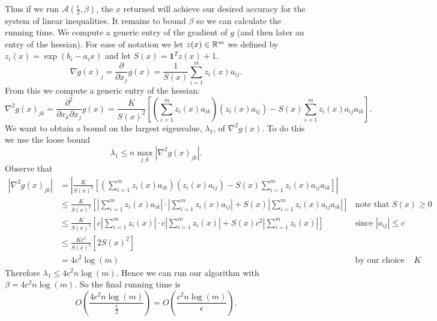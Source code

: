 \documentclass[letterpaper,12pt,oneside,onecolumn]{article}
\newcommand{\cA}{\mathcal{A}} \newcommand{\cB}{\mathcal{B}}
\begin{document}
\paragraph{}
Thus if we run $\cA(\frac{\epsilon}{2}, \beta)$, the $x$ returned will achieve our desired accuracy for the system of linear inequalities. It remains to bound $\beta$ so we can calculate the running time. We compute a generic entry of the gradient of $g$ (and then later an entry of the hessian). For ease of notation we let $z(x) \in \mathbb{R}^m$ we defined by $z_i(x) = \exp(b_i-a_ix)$ and let $S(x) = \textbf{1}^Tz(x) +1$.
$$\nabla g(x)_j = \frac{\partial}{\partial x_j} g(x) = \frac{1}{S(x)} \sum_{i=1}^m z_i(x)a_{ij}.$$
From this we compute a generic entry of the hessian:
$$\nabla^2g(x)_{jk} = \frac{\partial^2}{\partial x_k \partial x_j} g(x) = \frac{K}{S(x)^2} [(\sum_{i=1}^m z_i(x)a_{ik})(z_i(x)a_{ij}) - S(x)\sum_{i=1}^m z_i(x)a_{ij}a_{ik}].$$ 
We want to obtain a bound on the largest eigenvalue, $\lambda_1$, of $\nabla^2g(x)$. To do this we use the loose bound
$$\lambda_1 \leq n \max_{j,k} |\nabla^2g(x)_{jk}|.$$
Observe that
\begin{align*}
|\nabla^2g(x)_{jk}| &= |\frac{K}{S(x)^2} [(\sum_{i=1}^m z_i(x)a_{ik})(z_i(x)a_{ij}) - S(x)\sum_{i=1}^m z_i(x)a_{ij}a_{ik}]| \\
&\leq \frac{K}{S(x)^2}[ |\sum_{i=1}^m z_i(x)a_{ik}| \cdot |\sum_{i=1}^m z_i(x)a_{ij}| + S(x) |\sum_{i=1}^m z_i(x)a_{ij}a_{ik}| ]&\text{note that $S(x) \geq 0$} \\
&\leq \frac{K}{S(x)^2}[ c|\sum_{i=1}^m z_i(x)| \cdot c|\sum_{i=1}^m z_i(x)| + S(x) c^2|\sum_{i=1}^m z_i(x)| ] &\text{since $|a_{ij}| \leq c$}\\
&\leq \frac{Kc^2}{S(x)^2}[2S(x)^2 ] \\
&= 4c^2\log(m) &\text{by our choice of $K$}.
\end{align*}
Therefore $\lambda_1 \leq 4c^2 n\log(m)$. Hence we can run our algorithm with $\beta = 4c^2n\log(m)$. So the final running time is
$$O(\frac{4c^2n\log(m)}{\frac{\epsilon}{2}}) = O(\frac{c^2n\log(m)}{\epsilon}).$$



\end{document}
